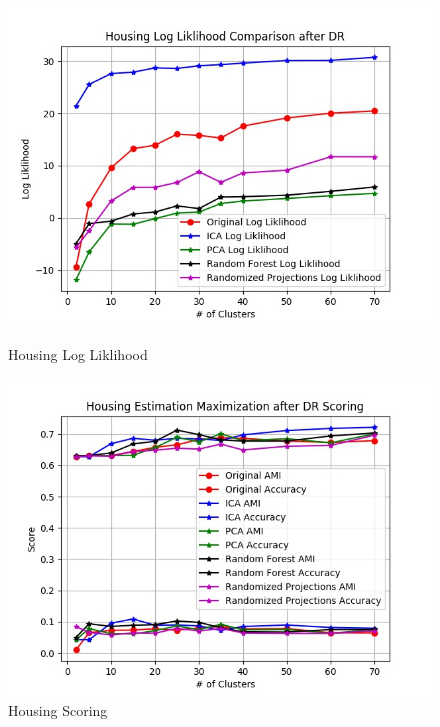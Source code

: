 \documentclass[h]{article}
\begin{document}
\begin{figure}[H]
      \includegraphics[width=1\textwidth,keepaspectratio]{housing_log_liklihood_comparison_after_dr.jpg} 
      \caption*{Housing Log Liklihood} 
   \endminipage\hfill
      \includegraphics[width=1\textwidth,keepaspectratio]{housing_estimation_maximization_after_dr_scoring.jpg} 
      \caption*{Housing Scoring} 
   \endminipage\hfill
  \end{figure}
\end{document}
